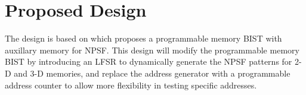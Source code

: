 \chapter{Proposed Design}
\label{chap:design}

The design is based on \cite{1584083} which proposes a programmable memory BIST with auxillary memory for NPSF.  This design will modify the programmable memory BIST by introducing an LFSR to dynamically generate the NPSF patterns for 2-D and 3-D memories, and replace the address generator with a programmable address counter to allow more flexibility in testing specific addresses.  






